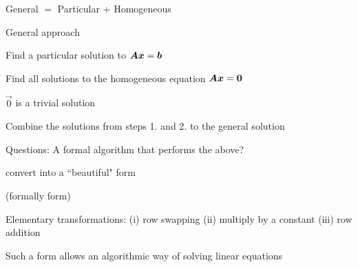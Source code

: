 \documentclass[handout,fleqn,aspectratio=169]{beamer}
\begin{document}
\begin{frame}{General $=$ Particular $+$ Homogeneous} 

\bci
\item General approach
\bce
\item Find a particular solution to $\bm{A} \bm{x} = \bm{b}$
\item Find all solutions to the homogeneous equation $\bm{A} \bm{x} = \bm{0}$
\bci
\item $\vec{0}$ is a trivial solution 
\eci
\item Combine the solutions from steps 1. and 2. to the general solution
\ece

\item Questions: A formal algorithm that performs the above?
\bci
\item {} convert into a ``beautiful" form 

(formally  form)

\item Elementary transformations: (i) row swapping (ii) multiply by a constant (iii) row addition
\eci

\item Such a form allows an algorithmic way of solving linear equations

\eci
\end{frame}
\end{document}
